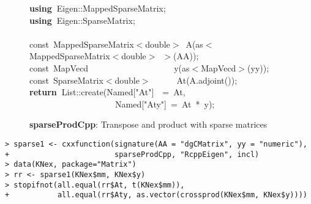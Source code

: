\documentclass[shortnames,article]{jss}
\newcommand{\hlstd}[1]{\textcolor[rgb]{0,0,0}{#1}}
\newcommand{\hlopt}[1]{\textcolor[rgb]{0,0,0}{#1}}
\newcommand{\hlstr}[1]{\textcolor[rgb]{0.90,0.15,0.15}{#1}}
\newcommand{\hlkwa}[1]{\textcolor[rgb]{0.61,0.13,0.93}{\bf{#1}}}
\newcommand{\hlkwb}[1]{\textcolor[rgb]{0.13,0.54,0.13}{#1}}
\newcommand{\hlkwd}[1]{\textcolor[rgb]{0,0,0}{#1}}
\begin{document}
\begin{figure}[htb]
  \noindent
  \ttfamily
  \hlstd{}\hlkwa{using\ }\hlstd{Eigen}\hlopt{::}\hlstd{MappedSparseMatrix}\hlopt{;}\hspace*{\fill}\\
  \hlstd{}\hlkwa{using\ }\hlstd{Eigen}\hlopt{::}\hlstd{SparseMatrix}\hlopt{;}\hspace*{\fill}\\
  \hlstd{}\hspace*{\fill}\\
  \hlkwb{const\ }\hlstd{MappedSparseMatrix}\hlopt{$<$}\hlstd{}\hlkwb{double}\hlstd{}\hlopt{$>$\ }\hlstd{}\hlkwd{A}\hlstd{}\hlopt{(}\hlstd{as}\hlopt{$<$}\hlstd{MappedSparseMatrix}\hlopt{$<$}\hlstd{}\hlkwb{double}\hlstd{}\hlopt{$>$\ $>$(}\hlstd{AA}\hlopt{));}\hspace*{\fill}\\
  \hlstd{}\hlkwb{const\ }\hlstd{MapVecd}\hlstd{\ \ \ \ \ \ \ \ \ \ \ \ \ \ \ \ \ \ \ \ }\hlstd{}\hlkwd{y}\hlstd{}\hlopt{(}\hlstd{as}\hlopt{$<$}\hlstd{MapVecd}\hlopt{$>$(}\hlstd{yy}\hlopt{));}\hspace*{\fill}\\
  \hlstd{}\hlkwb{const\ }\hlstd{SparseMatrix}\hlopt{$<$}\hlstd{}\hlkwb{double}\hlstd{}\hlopt{$>$}\hlstd{\ \ \ \ \ \ }\hlopt{}\hlstd{}\hlkwd{At}\hlstd{}\hlopt{(}\hlstd{A}\hlopt{.}\hlstd{}\hlkwd{adjoint}\hlstd{}\hlopt{());}\hspace*{\fill}\\
  \hlstd{}\hlkwa{return\ }\hlstd{List}\hlopt{::}\hlstd{}\hlkwd{create}\hlstd{}\hlopt{(}\hlstd{Named}\hlopt{{[}}\hlstd{}\hlstr{"At"}\hlstd{}\hlopt{{]}}\hlstd{\ \ }\hlopt{=\ }\hlstd{At}\hlopt{,}\hspace*{\fill}\\
  \hlstd{}\hlstd{\ \ \ \ \ \ \ \ \ \ \ \ \ \ \ \ \ \ \ \ }\hlstd{Named}\hlopt{{[}}\hlstd{}\hlstr{"Aty"}\hlstd{}\hlopt{{]}\ =\ }\hlstd{At\ }\hlopt{{*}\ }\hlstd{y}\hlopt{);}\hlstd{}\hspace*{\fill}\\
  \mbox{}
  \normalfont
  \normalsize
  \caption{\textbf{sparseProdCpp}: Transpose and product with sparse matrices}
  \label{sparseProd}
\end{figure}

\begin{verbatim}
> sparse1 <- cxxfunction(signature(AA = "dgCMatrix", yy = "numeric"),
+                        sparseProdCpp, "RcppEigen", incl)
> data(KNex, package="Matrix")
> rr <- sparse1(KNex$mm, KNex$y)
> stopifnot(all.equal(rr$At, t(KNex$mm)),
+           all.equal(rr$Aty, as.vector(crossprod(KNex$mm, KNex$y))))
\end{verbatim}
\end{document}
